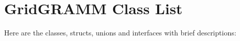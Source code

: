 \section{Grid\-GRAMM Class List}
Here are the classes, structs, unions and interfaces with brief descriptions:\begin{CompactList}
\item{}
\item{}
\end{CompactList}
